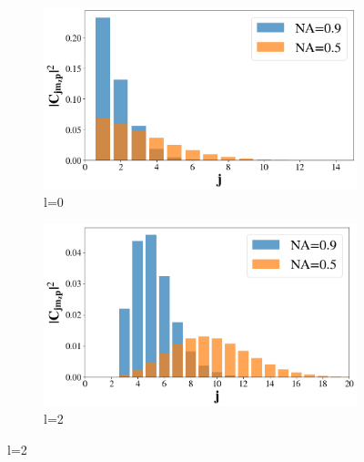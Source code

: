 \begin{figure}[htbp]
    \centering
    \begin{subfigure}[b]{0.49\textwidth}
        \centering
        \includegraphics[width=\textwidth]{Figures/contentl0.png} %
        \caption{l=0}
        \label{fig:aa}
    \end{subfigure}
    \hfill
    \begin{subfigure}[b]{0.49\textwidth}
        \centering
        \includegraphics[width=\textwidth]{Figures/contentl2.png} %
        \caption{l=2}
        \label{fig:bb}
    \end{subfigure}

    \vspace{1em} %


\end{figure}

